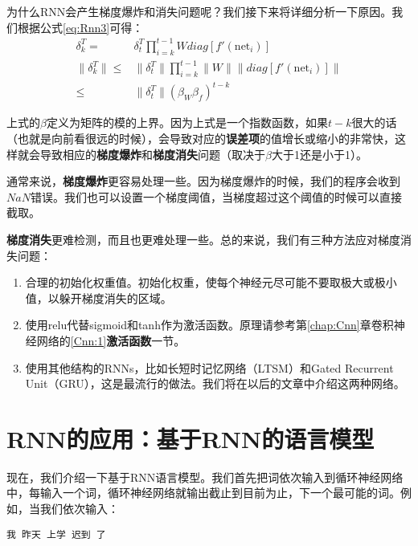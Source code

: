 为什么RNN会产生梯度爆炸和消失问题呢？我们接下来将详细分析一下原因。我们根据公式\ref{eq:Rnn3}可得：
\begin{align*}
	\delta_k^T=             & \delta_t^T\prod_{i=k}^{t-1}Wdiag[f'(\mathrm{net}_{i})]             \\
	\|\delta_k^T\|\leqslant & \|\delta_t^T\|\prod_{i=k}^{t-1}\|W\|\|diag[f'(\mathrm{net}_{i})]\| \\
	\leqslant               & \|\delta_t^T\|(\beta_W\beta_f)^{t-k}
\end{align*}

上式的\(\beta\)定义为矩阵的模的上界。因为上式是一个指数函数，如果$t-k$很大的话（也就是向前看很远的时候），会导致对应的\textbf{误差项}的值增长或缩小的非常快，这样就会导致相应的\textbf{梯度爆炸}和\textbf{梯度消失}问题（取决于\(\beta\)大于1还是小于1）。

通常来说，\textbf{梯度爆炸}更容易处理一些。因为梯度爆炸的时候，我们的程序会收到$NaN$错误。我们也可以设置一个梯度阈值，当梯度超过这个阈值的时候可以直接截取。

\textbf{梯度消失}更难检测，而且也更难处理一些。总的来说，我们有三种方法应对梯度消失问题：

\begin{enumerate}
	\item
	      合理的初始化权重值。初始化权重，使每个神经元尽可能不要取极大或极小值，以躲开梯度消失的区域。
	\item
	      使用relu代替sigmoid和tanh作为激活函数。原理请参考第\ref{chap:Cnn}章卷积神经网络的\ref{Cnn:1}\textbf{激活函数}一节。
	\item
	      使用其他结构的RNNs，比如长短时记忆网络（LTSM）和Gated Recurrent   Unit（GRU），这是最流行的做法。我们将在以后的文章中介绍这两种网络。
\end{enumerate}







\section{RNN的应用：基于RNN的语言模型}\label{Rnn:9}

现在，我们介绍一下基于RNN语言模型。我们首先把词依次输入到循环神经网络中，每输入一个词，循环神经网络就输出截止到目前为止，下一个最可能的词。例如，当我们依次输入：
\begin{lstlisting}[numbers=none]
    我 昨天 上学 迟到 了
\end{lstlisting}

